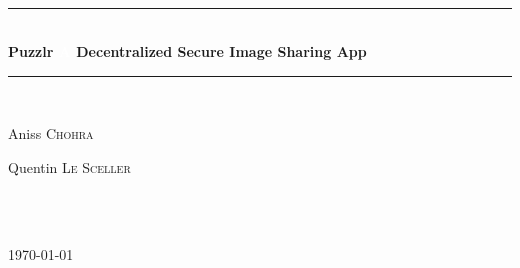 \begin{titlepage}
 \newcommand{\HRule}{\rule{\linewidth}{0.5mm}}
 \center
 
 
 \textsc{\LARGE }\\[8.0cm]
 
 
 \HRule \\[0.4cm]
 {
  \Huge \bfseries  Puzzlr \linebreak
  \Huge \textcolor{white}{A} \LARGE  Decentralized Secure Image Sharing App
 }
 \HRule \\[1.5cm]
 
 
 \begin{minipage}{1\textwidth}
  \begin{flushleft}
   \center Aniss \textsc{Chohra}
  \end{flushleft}
  \begin{flushleft}
   \center Quentin \textsc{Le Sceller}
  \end{flushleft}


 \end{minipage}
 ~
 \newline
 \newline
 
 
 \begin{minipage}{1\textwidth}
 
  \begin{flushleft}
 
  \end{flushleft}

 \end{minipage}\\[4cm]
 
 
 {\large \today}\\[3cm]
 
 \vfill


\end{titlepage}

